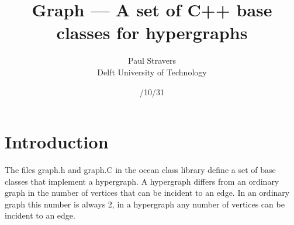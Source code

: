 


    \renewcommand{\textfraction}{0.05}     \renewcommand{\topfraction}{0.95}
    \renewcommand{\bottomfraction}{0.95}

    

    \newcommand{\figdir}{/usr1/ocean/src/libocean/doc}

    \newcommand{\fig}[1]{\centerline{\psfig{figure=\figdir/#1.ps}}}

    \newcommand{\figopt}[2]{\centerline{\psfig{figure=\figdir/#1.ps,#2}}}

    \newcommand{\file}[1]{{#1}}
    \newcommand{\class}[1]{{#1}}
    \newcommand{\type}[1]{{#1}}




\title{\sf Graph --- A set of C++ base classes for hypergraphs}
\author{\sf Paul Stravers\\ \sf Delft University of Technology}
\date{/10/31}
\maketitle
\noindent\makebox[\textwidth]{\hrulefill}
\tableofcontents
\vspace*{3ex}
\noindent\makebox[\textwidth]{\hrulefill}
\section{Introduction}
The files \file{graph.h} and \file{graph.C} in the ocean class library define a
set of base classes that implement a hypergraph. A hypergraph differs from an
ordinary graph in the number of vertices that can be incident to an edge. In an
ordinary graph this number is always 2, in a hypergraph any number of vertices
can be incident to an edge.

